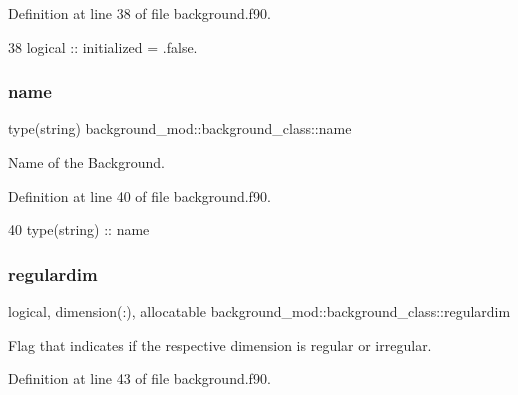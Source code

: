 Definition at line 38 of file background.\+f90.


\begin{DoxyCode}
38         \textcolor{keywordtype}{logical} :: initialized = .false.
\end{DoxyCode}
\mbox{\label{structbackground__mod_1_1background__class_a4f812fd2adfe5d1e50db63e75e460022}} 
\subsubsection{\texorpdfstring{name}{name}}
{\footnotesize\ttfamily type(string) background\+\_\+mod\+::background\+\_\+class\+::name\hspace{0.3cm}{\ttfamily [private]}}



Name of the Background. 



Definition at line 40 of file background.\+f90.


\begin{DoxyCode}
40         \textcolor{keywordtype}{type}(string) :: name
\end{DoxyCode}
\mbox{\label{structbackground__mod_1_1background__class_a78b62368ed110d33fd809e8ff101839b}} 
\subsubsection{\texorpdfstring{regulardim}{regulardim}}
{\footnotesize\ttfamily logical, dimension(\+:), allocatable background\+\_\+mod\+::background\+\_\+class\+::regulardim\hspace{0.3cm}{\ttfamily [private]}}



Flag that indicates if the respective dimension is regular or irregular. 



Definition at line 43 of file background.\+f90.


